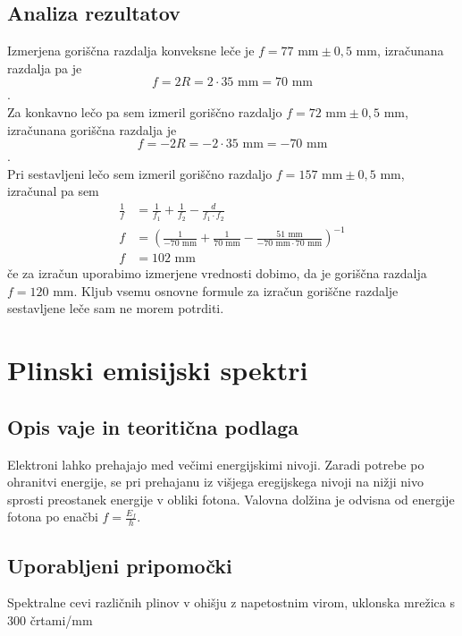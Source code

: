 \documentclass[12pt]{article}
\begin{document}
	\subsection*{Analiza rezultatov}
	Izmerjena goriščna razdalja konveksne leče je $f = 77 \text{ mm} \pm 0,5 \text{ mm}$,
	izračunana razdalja pa je 
	\begin{equation}
		f = 2R = 2 \cdot 35 \text{ mm} = 70 \text{ mm}
	\end{equation}.\\
	Za konkavno lečo pa sem izmeril goriščno razdaljo $f = 72 \text{ mm} \pm 0,5 \text{ mm}$, 
	izračunana goriščna razdalja je 
	\begin{equation}
		f = -2R = -2 \cdot 35 \text{ mm} = -70 \text{ mm}
	\end{equation}.\\
	Pri sestavljeni lečo sem izmeril goriščno razdaljo $f = 157 \text{ mm} \pm 0,5 \text{ mm}$,
	izračunal pa sem
	\begin{equation}
		\begin{split}
			\frac{1}{f} &= \frac{1}{f_1} + \frac{1}{f_2} - \frac{d}{f_1 \cdot f_2} \\
			f &= (\frac{1}{-70 \text{ mm}} + \frac{1}{70 \text{ mm}} - \frac{51 \text{ mm}}{-70 \text{ mm} \cdot 70 \text{ mm}})^{-1}\\
			f &= 102 \text{ mm}
		\end{split}
	\end{equation}
	če za izračun uporabimo izmerjene vrednosti dobimo, da je goriščna razdalja $f = 120 \text{ mm}$.
	Kljub vsemu osnovne formule za izračun goriščne razdalje sestavljene leče sam ne morem
	potrditi.


\newpage
\section{Plinski emisijski spektri}
	\subsection*{Opis vaje in teoritična podlaga}
	Elektroni lahko prehajajo med večimi energijskimi nivoji. Zaradi potrebe po ohranitvi
	energije, se pri prehajanu iz višjega eregijskega nivoji na nižji nivo sprosti preostanek
	energije v obliki fotona. Valovna dolžina je odvisna od energije fotona po enačbi $f = \frac{E_f}{h}$.

	\subsection*{Uporabljeni pripomočki}
	Spektralne cevi različnih plinov v ohišju z napetostnim virom, uklonska mrežica s 300 črtami/mm
\end{document}
